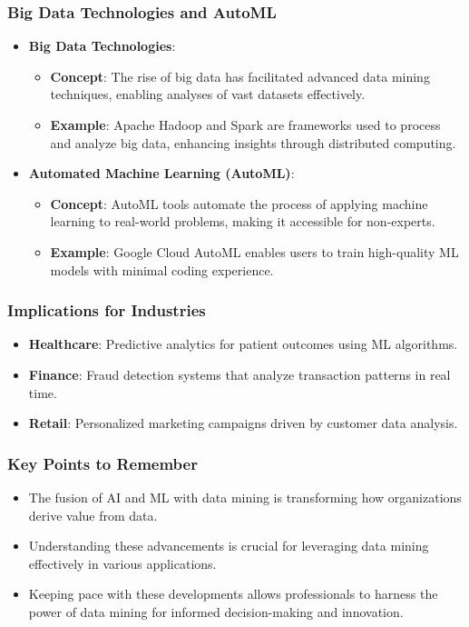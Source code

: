 \documentclass{beamer}
\begin{document}
\begin{frame}[fragile]
    \frametitle{Big Data Technologies and AutoML}
    \begin{itemize}
        \item \textbf{Big Data Technologies}:
        \begin{itemize}
            \item \textbf{Concept}: The rise of big data has facilitated advanced data mining techniques, enabling analyses of vast datasets effectively.
            \item \textbf{Example}: Apache Hadoop and Spark are frameworks used to process and analyze big data, enhancing insights through distributed computing.
        \end{itemize}

        \item \textbf{Automated Machine Learning (AutoML)}:
        \begin{itemize}
            \item \textbf{Concept}: AutoML tools automate the process of applying machine learning to real-world problems, making it accessible for non-experts.
            \item \textbf{Example}: Google Cloud AutoML enables users to train high-quality ML models with minimal coding experience.
        \end{itemize}
    \end{itemize}
\end{frame}

\begin{frame}[fragile]
    \frametitle{Implications for Industries}
    \begin{itemize}
        \item \textbf{Healthcare}: Predictive analytics for patient outcomes using ML algorithms.
        \item \textbf{Finance}: Fraud detection systems that analyze transaction patterns in real time.
        \item \textbf{Retail}: Personalized marketing campaigns driven by customer data analysis.
    \end{itemize}
\end{frame}

\begin{frame}[fragile]
    \frametitle{Key Points to Remember}
    \begin{itemize}
        \item The fusion of AI and ML with data mining is transforming how organizations derive value from data.
        \item Understanding these advancements is crucial for leveraging data mining effectively in various applications.
        \item Keeping pace with these developments allows professionals to harness the power of data mining for informed decision-making and innovation.
    \end{itemize}
\end{frame}
\end{document}
